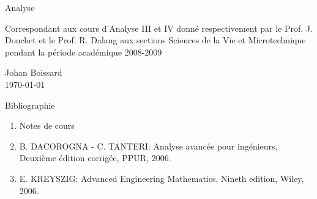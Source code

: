 
\begin{titlepage}
\begin{center}
\vspace*{10mm}
\par
\vspace*{1.5in}
{\Huge Analyse}%
\par
\vspace{1.5in}
{\large Correspondant aux cours d'Analyse III et IV donné respectivement par le Prof. J. Douchet et le Prof. R. Dalang aux sections Sciences de la Vie et Microtechnique pendant la période académique 2008-2009}
\par
\vspace{1in}
	Johan Boissard
	\\
	\today 
\end{center}
\end{titlepage}


Bibliographie
\begin{enumerate}
\item Notes de cours
\item B. DACOROGNA - C. TANTERI: Analyse avancée pour ingénieurs, Deuxième édition corrigée, PPUR, 2006.
\item E. KREYSZIG: Advanced Engineering Mathematics, Nineth edition, Wiley, 2006.
\end{enumerate}
\tableofcontents
